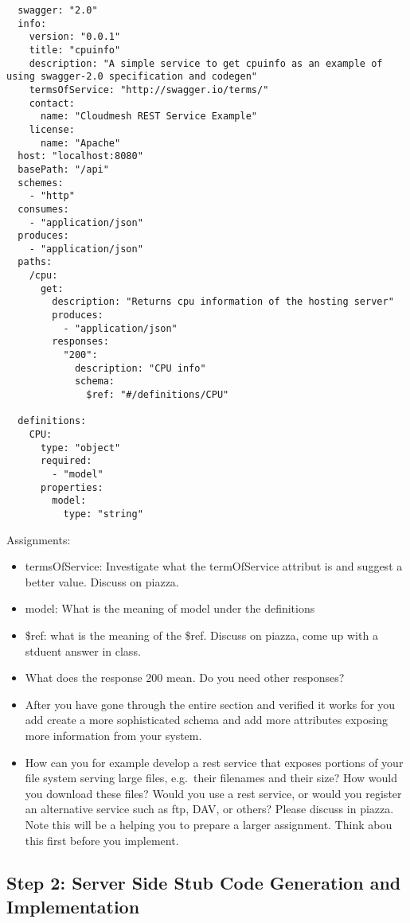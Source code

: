 \begin{verbatim}
  swagger: "2.0"
  info: 
    version: "0.0.1"
    title: "cpuinfo"
    description: "A simple service to get cpuinfo as an example of using swagger-2.0 specification and codegen"
    termsOfService: "http://swagger.io/terms/"
    contact: 
      name: "Cloudmesh REST Service Example"
    license: 
      name: "Apache"
  host: "localhost:8080"
  basePath: "/api"
  schemes: 
    - "http"
  consumes: 
    - "application/json"
  produces: 
    - "application/json"
  paths: 
    /cpu:
      get: 
        description: "Returns cpu information of the hosting server"
        produces: 
          - "application/json"
        responses: 
          "200":
            description: "CPU info"
            schema: 
              $ref: "#/definitions/CPU"

  definitions:
    CPU:
      type: "object"
      required: 
        - "model"
      properties: 
        model:
          type: "string"
\end{verbatim}

Assignments:

\begin{itemize}
\tightlist
\item
  termsOfService: Investigate what the termOfService attribut is and
  suggest a better value. Discuss on piazza.
\item
  model: What is the meaning of model under the definitions
\item
  \$ref: what is the meaning of the \$ref. Discuss on piazza, come up
  with a stduent answer in class.
\item
  What does the response 200 mean. Do you need other responses?
\item
  After you have gone through the entire section and verified it works
  for you add create a more sophisticated schema and add more attributes
  exposing more information from your system.
\item
  How can you for example develop a rest service that exposes portions
  of your file system serving large files, e.g.~their filenames and
  their size? How would you download these files? Would you use a rest
  service, or would you register an alternative service such as ftp,
  DAV, or others? Please discuss in piazza. Note this will be a helping
  you to prepare a larger assignment. Think abou this first before you
  implement.
\end{itemize}

\hypertarget{step-2-server-side-stub-code-generation-and-implementation}{%
\subsection{Step 2: Server Side Stub Code Generation and
Implementation}\label{step-2-server-side-stub-code-generation-and-implementation}}

